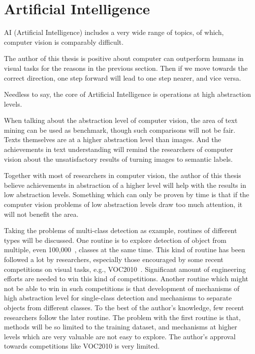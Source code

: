 \section{Artificial Intelligence}
AI (Artificial Intelligence) includes a very wide range of topics, of which, computer vision is comparably difficult. 

The author of this thesis is positive about computer can outperform humans in visual tasks for the reasons in the previous section. Then if we move towards the correct direction, one step forward will lead to one step nearer, and vice versa. 

Needless to say, the core of Artificial Intelligence is operations at high abstraction levels.

When talking about the abstraction level of computer vision, the area of text mining can be used as benchmark, though such comparisons will not be fair. Texts themselves are at a higher abstraction level than images. And the achievements in text understanding will remind the researchers of computer vision about the unsatisfactory results of turning images to semantic labels. 

Together with most of researchers in computer vision, the author of this thesis believe achievements in abstraction of a higher level will help with the results in low abstraction levels. Something which can only be proven by time is that if the computer vision problems of low abstraction levels draw too much attention, it will not benefit the area.


Taking the problems of multi-class detection as example, routines of different types will be discussed. One routine is to explore detection of object from multiple, even 100,000~\cite{408}, classes at the same time. This kind of routine has been followed a lot by researchers, especially those encouraged by some recent competitions on visual tasks, e.g., VOC2010~\cite{voc}. Significant amount of engineering efforts are needed to win this kind of competitions. Another routine which might not be able to win in such competitions is that
development of mechanisms of high abstraction level for single-class detection and mechanisms to separate objects from different classes. To the best of the author's knowledge, few recent researchers follow the later routine. The problem with the first routine is that, methods will be so limited to the training dataset, and mechanisms at higher levels which are very valuable are not easy to explore. The author's approval towards competitions like VOC2010 is very limited.

